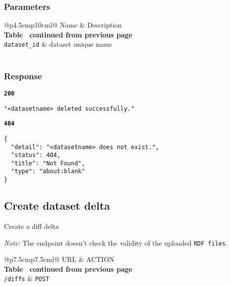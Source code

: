 \subsubsection{Parameters}
\begin{longtable}[c]{@{}p{4.5cm}p{10cm}l@{}}
  \toprule
  Name                 & Description                          \\* \midrule
  \endfirsthead
  \multicolumn{3}{c}%
  {{\bfseries Table \thetable\ continued from previous page}} \\
  \endhead
  \bottomrule
  \endfoot
  \endlastfoot
  \texttt{dataset\_id} & dataset unique name                  \\* \bottomrule
  \label{tab:rdf-differ-get-diff-parameters}                  \\
\end{longtable}

\subsubsection{Response}
\textbf{\texttt{200}}
\begin{lstlisting}
"<datasetname> deleted successfully."
\end{lstlisting}

\textbf{\texttt{404}}
\begin{lstlisting}
{
  "detail": "<datasetname> does not exist.",
  "status": 404,
  "title": "Not Found",
  "type": "about:blank"
}
\end{lstlisting}

\subsection{Create dataset delta}
Create a diff delta

\textit{Note:} The endpoint doesn't check the validity of the uploaded \texttt{RDF files}.

\begin{longtable}[c]{@{}p{7.5cm}p{7.5cm}l@{}}
  \toprule
  URL             & ACTION                                    \\* \midrule
  \endfirsthead
  \multicolumn{3}{c}%
  {{\bfseries Table \thetable\ continued from previous page}} \\
  \endhead
  \bottomrule
  \endfoot
  \endlastfoot
  \texttt{/diffs} & \texttt{POST}                             \\* \bottomrule
  \label{tab:rdf-differ-create-diffs}                         \\
\end{longtable}

